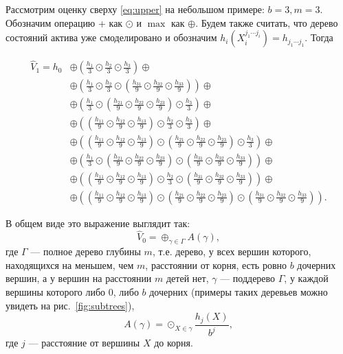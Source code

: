 \documentclass[specialist,
               substylefile = ../spbu.rtx,
               subf,href,colorlinks=true, 12pt]{disser}
\newcommand{\Vhat}{\hat{V}}
\begin{document}
Рассмотрим оценку сверху \eqref{eq:upper} на небольшом примере: $b = 3, m = 3$. Обозначим операцию + как $\odot$ и $\max$ как $\oplus$. Будем также считать, что дерево состояний актива уже смоделировано и обозначим $h_i\left(X_i^{j_1\cdots j_i}\right) = h_{j_1\cdots j_1}$. Тогда

$$
\begin{aligned}
\Vhat_1 = h_0 &\oplus \left(\frac{h_1}{3}\odot\frac{h_2}{3}\odot\frac{h_3}{3}\right)\oplus \\
    &\oplus \left(\frac{h_1}{3}\odot\frac{h_2}{3}\odot\left(\frac{h_{31}}{9}\odot\frac{h_{32}}{9}\odot\frac{h_{33}}{9}\right)\right) \oplus \\
    &\oplus \left(\frac{h_1}{3}\odot\left(\frac{h_{21}}{9}\odot\frac{h_{22}}{9}\odot\frac{h_{23}}{9}\right)\odot\frac{h_3}{3}\right) \oplus \\
    &\oplus \left(\left(\frac{h_{11}}{9}\odot\frac{h_{12}}{9}\odot\frac{h_{13}}{9}\right)\odot\frac{h_2}{3}\odot\frac{h_3}{3}\right)\oplus \\
    &\oplus\left(\left(\frac{h_{11}}{9}\odot\frac{h_{12}}{9}\odot\frac{h_{13}}{9}\right)\odot\left(\frac{h_{21}}{9}\odot\frac{h_{22}}{9}\odot\frac{h_{23}}{9}\right)\odot\frac{h_3}{3}\right)\oplus \\
    &\oplus \left(\frac{h_1}{3}\odot\left(\frac{h_{21}}{9}\odot\frac{h_{22}}{9}\odot\frac{h_{23}}{9}\right)\odot\left(\frac{h_{31}}{9}\odot\frac{h_{32}}{9}\odot\frac{h_{33}}{9}\right)\right) \oplus \\
    &\oplus \left(\left(\frac{h_{11}}{9}\odot\frac{h_{12}}{9}\odot\frac{h_{13}}{9}\right)\odot\frac{h_2}{3}\odot\left(\frac{h_{31}}{9}\odot\frac{h_{32}}{9}\odot\frac{h_{33}}{9}\right)\right)\oplus \\
    &\oplus \left(\left(\frac{h_{11}}{9}\odot\frac{h_{12}}{9}\odot\frac{h_{13}}{9}\right)\odot\left(\frac{h_{21}}{9}\odot\frac{h_{22}}{9}\odot\frac{h_{23}}{9}\right)\odot\left(\frac{h_{31}}{9}\odot\frac{h_{32}}{9}\odot\frac{h_{33}}{9}\right)\right).
\end{aligned}
$$


В общем виде это выражение выглядит так: $$\Vhat_0 = \oplus_{\gamma\in\Gamma}A\left(\gamma\right),$$ где $\Gamma$ --- полное дерево глубины $m$, т.е. дерево, у всех вершин которого, находящихся на меньшем, чем $m$, расстоянии от корня, есть ровно $b$ дочерних вершин, а у вершин на расстоянии $m$ детей нет, $\gamma$ --- поддерево $\Gamma$, у каждой вершины которого либо 0, либо $b$ дочерних (примеры таких деревьев можно увидеть на рис.~\ref{fig:subtrees}), 
\[A\left(\gamma\right) = \odot_{X\in\gamma} \frac{h_j\left(X\right)}{b^j},\] 
где $j$ --- расстояние от вершины $X$ до корня.
\end{document}
